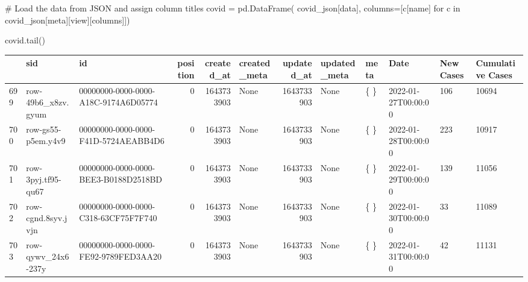 \documentclass[
  letterpaper,
  DIV=11,
  numbers=noendperiod]{scrreprt}
\newenvironment{Shaded}{\begin{snugshade}}{\end{snugshade}}
\newcommand{\CommentTok}[1]{\textcolor[rgb]{0.37,0.37,0.37}{#1}}
\newcommand{\ControlFlowTok}[1]{\textcolor[rgb]{0.00,0.23,0.31}{#1}}
\newcommand{\KeywordTok}[1]{\textcolor[rgb]{0.00,0.23,0.31}{#1}}
\newcommand{\NormalTok}[1]{\textcolor[rgb]{0.00,0.23,0.31}{#1}}
\newcommand{\OperatorTok}[1]{\textcolor[rgb]{0.37,0.37,0.37}{#1}}
\newcommand{\StringTok}[1]{\textcolor[rgb]{0.13,0.47,0.30}{#1}}
\begin{document}
\begin{Shaded}
\begin{Highlighting}[]
\CommentTok{\# Load the data from JSON and assign column titles}
\NormalTok{covid }\OperatorTok{=}\NormalTok{ pd.DataFrame(}
\NormalTok{    covid\_json[}\StringTok{\textquotesingle{}data\textquotesingle{}}\NormalTok{],}
\NormalTok{    columns}\OperatorTok{=}\NormalTok{[c[}\StringTok{\textquotesingle{}name\textquotesingle{}}\NormalTok{] }\ControlFlowTok{for}\NormalTok{ c }\KeywordTok{in}\NormalTok{ covid\_json[}\StringTok{\textquotesingle{}meta\textquotesingle{}}\NormalTok{][}\StringTok{\textquotesingle{}view\textquotesingle{}}\NormalTok{][}\StringTok{\textquotesingle{}columns\textquotesingle{}}\NormalTok{]])}

\NormalTok{covid.tail()}
\end{Highlighting}
\end{Shaded}

\begin{tabular}{lllrrlrlllll}
\toprule
{} &                 sid &                                    id &  position &  created\_at & created\_meta &  updated\_at & updated\_meta & meta &                 Date & New Cases & Cumulative Cases \\
\midrule
699 &  row-49b6\_x8zv.gyum &  00000000-0000-0000-A18C-9174A6D05774 &         0 &  1643733903 &         None &  1643733903 &         None &  \{ \} &  2022-01-27T00:00:00 &       106 &            10694 \\
700 &  row-gs55-p5em.y4v9 &  00000000-0000-0000-F41D-5724AEABB4D6 &         0 &  1643733903 &         None &  1643733903 &         None &  \{ \} &  2022-01-28T00:00:00 &       223 &            10917 \\
701 &  row-3pyj.tf95-qu67 &  00000000-0000-0000-BEE3-B0188D2518BD &         0 &  1643733903 &         None &  1643733903 &         None &  \{ \} &  2022-01-29T00:00:00 &       139 &            11056 \\
702 &  row-cgnd.8syv.jvjn &  00000000-0000-0000-C318-63CF75F7F740 &         0 &  1643733903 &         None &  1643733903 &         None &  \{ \} &  2022-01-30T00:00:00 &        33 &            11089 \\
703 &  row-qywv\_24x6-237y &  00000000-0000-0000-FE92-9789FED3AA20 &         0 &  1643733903 &         None &  1643733903 &         None &  \{ \} &  2022-01-31T00:00:00 &        42 &            11131 \\
\bottomrule
\end{tabular}
\end{document}
